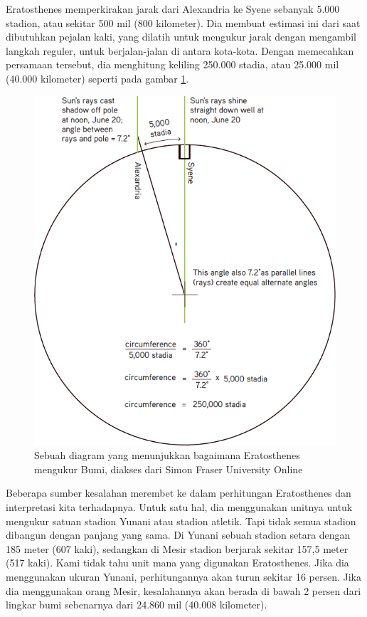 Eratosthenes memperkirakan jarak dari Alexandria ke Syene sebanyak 5.000 stadion, atau sekitar 500 mil (800 kilometer). Dia membuat estimasi ini dari saat dibutuhkan pejalan kaki, yang dilatih untuk mengukur jarak dengan mengambil langkah reguler, untuk berjalan-jalan di antara kota-kota. Dengan memecahkan persamaan tersebut, dia menghitung keliling 250.000 stadia, atau 25.000 mil (40.000 kilometer) seperti pada gambar \ref{diagrampengukuranbumi}.
\begin{figure}[ht]
	\centerline{\includegraphics[width=1\textwidth]{figures/diagrampengukuranbumi.png}}
	\caption{Sebuah diagram yang menunjukkan bagaimana Eratosthenes mengukur Bumi, diakses dari Simon Fraser University Online}
	\label{diagrampengukuranbumi}
	\end{figure}
Beberapa sumber kesalahan merembet ke dalam perhitungan Eratosthenes dan interpretasi kita terhadapnya. Untuk satu hal, dia menggunakan unitnya untuk mengukur satuan stadion Yunani atau stadion atletik. Tapi tidak semua stadion dibangun dengan panjang yang sama. Di Yunani sebuah stadion setara dengan 185 meter (607 kaki), sedangkan di Mesir stadion berjarak sekitar 157,5 meter (517 kaki). Kami tidak tahu unit mana yang digunakan Eratosthenes. Jika dia menggunakan ukuran Yunani, perhitungannya akan turun sekitar 16 persen. Jika dia menggunakan orang Mesir, kesalahannya akan berada di bawah 2 persen dari lingkar bumi sebenarnya dari 24.860 mil (40.008 kilometer).
